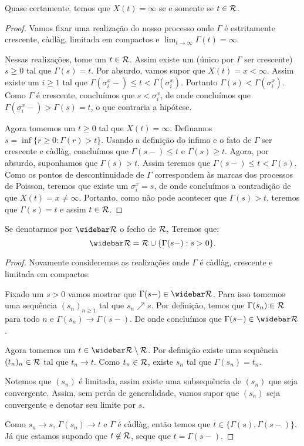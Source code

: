 \begin{proposicao}
  Quase certamente, temos que $X(t) = \infty$ se e somente se $t \in {\mathcal{R}}$.
\end{proposicao}
\begin{proof}
  Vamos fixar uma realização do nosso processo onde $\Gamma$ é
  estritamente crescente, càdlàg, limitada em compactos e $\lim_{t \to
    \infty} \Gamma(t) = \infty$.

  Nessas realizações, tome um $t \in {\mathcal{R}}$. Assim existe um (único por
  $\Gamma$ ser crescente) $s \geq 0$ tal que $\Gamma(s) = t$. Por
  absurdo, vamos supor que $X(t) = x < \infty$. Assim existe um $i
  \geq 1$ tal que $\Gamma(\sigma_i^x -) \leq t <
  \Gamma(\sigma_i^x)$. Portanto $\Gamma(s) < \Gamma(\sigma_i^x)$. Como
  $\Gamma$ é crescente, concluímos que $s < \sigma_i^x$, de onde
  concluímos que $\Gamma(\sigma_i^x-) > \Gamma(s) = t$, o que
  contraria a hipótese.

  Agora tomemos um $t \geq 0$ tal que $X(t) = \infty$. Definamos $s =
  \inf \{ r \geq 0 : \Gamma(r) > t \}$. Usando a definição do ínfimo e
  o fato de $\Gamma$ ser crescente e càdlàg, concluímos que
  $\Gamma(s-) \leq t$ e $\Gamma(s) \geq t$. Agora, por absurdo,
  suponhamos que $\Gamma(s) > t$. Assim teremos que $\Gamma(s-) \leq t
  < \Gamma(s)$. Como os pontos de descontinuidade de $\Gamma$
  correspondem às marcas dos processos de Poisson, teremos que existe
  um $\sigma_i^x = s$, de onde concluímos a contradição de que $X(t) =
  x \neq \infty$. Portanto, como não pode acontecer que $\Gamma(s) >
  t$, teremos que $\Gamma(s) = t$ e assim $t \in {\mathcal{R}}$.
\end{proof}

\begin{proposicao}
  Se denotarmos por $\RRb$ o fecho de ${\mathcal{R}}$, Teremos que:
  \begin{displaymath}
    \RRb = \RR \cup \{ \Gamma(s-) : s > 0 \}.
  \end{displaymath}
\end{proposicao}
\begin{proof}
  Novamente consideremos as realizações onde $\Gamma$ é càdlàg, crescente
  e limitada em compactos.

  Fixado um $s > 0$ vamos mostrar que $\Gamma(s-) \in \RRb$. Para isso
  tomemos uma sequência $(s_n)_{n \geq 1}$ tal que $s_n \nearrow s$. Por
  definição, temos que $\Gamma(s_n) \in {\mathcal{R}}$ para todo $n$ e
  $\Gamma(s_n) \to \Gamma(s-)$. De onde concluímos que $\Gamma(s-) \in
  \RRb$.

  Agora tomemos um $t \in \RRb \setminus \RR$. Por definição existe uma
  sequência $(t_n)_n \in {\mathcal{R}}$ tal que $t_n \to t$. Como $t_n \in {\mathcal{R}}$,
  existe $s_n$ tal que $\Gamma(s_n) = t_n$.

  Notemos que $(s_n)$ é limitada, assim existe uma subsequência de
  $(s_n)$ que seja convergente. Assim, sem perda de generalidade, vamos
  supor que $(s_n)$ seja convergente e denotar seu limite por $s$.

  Como $s_n \to s$, $\Gamma(s_n) \to t$ e $\Gamma$ é càdlàg, então
  temos que $t \in \{ \Gamma(s), \Gamma(s-) \}$. Já que estamos
  supondo que $t \not\in {\mathcal{R}}$, seque que $t = \Gamma(s-)$.
\end{proof}

